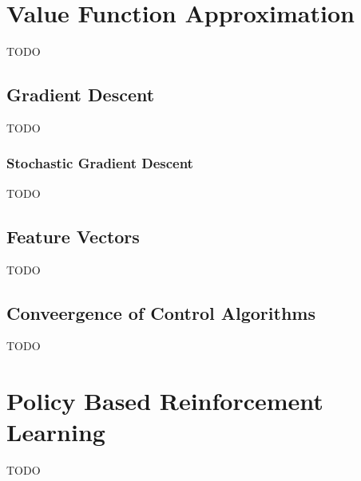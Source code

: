 \section{Value Function Approximation}\label{sec:value-function-approximation}
TODO

\subsection{Gradient Descent}\label{subsec:gradient-descent}
TODO

\subsubsection{Stochastic Gradient Descent}\label{subsubsec:stochastic-gradient-descent}
TODO

\subsection{Feature Vectors}\label{subsec:feature-vectors}
TODO

\subsection{Conveergence of Control Algorithms}\label{subsec:convergence-of-control-algorithms}
TODO


\section{Policy Based Reinforcement Learning}\label{sec:policy-based-reinforcement-learning}
TODO

